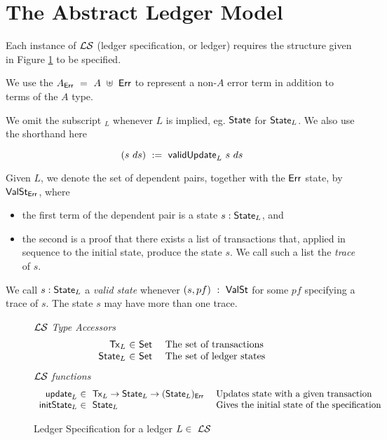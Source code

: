 \section{The Abstract Ledger Model}
\label{sec:model}


Each instance of $\mathcal{L}\mathcal{S}$ (ledger specification, or ledger) requires the structure
given in Figure \ref{fig:ledger-spec} to be specified.

We use the $A_{\mathsf{Err}}~=~A~\uplus~\mathsf{Err}$ to represent a non-$A$ error term in
addition to terms of the $A$ type.

We omit the subscript $_L$ whenever $L$ is implied, eg. $\mathsf{State}$ for $\mathsf{State}_L$.
We also use the shorthand here

\[ (s~ds)~:=~\mathsf{validUpdate}_L~ s~ ds \]


Given $L$, we denote the set of dependent pairs, together with the $\mathsf{Err}$ state, by $\mathsf{ValSt}_{\mathsf{Err}}$, where

\begin{itemize}
  \item the first term of the dependent pair is a state $s : \mathsf{State}_L$, and
  \item the second is a proof that there exists a list of transactions that, applied in sequence to
 the initial state, produce the state $s$. We call such a list the \emph{trace} of $s$.
\end{itemize}

We call $s : \mathsf{State}_L$ a \emph{valid state} whenever $(s, pf)~:~\mathsf{ValSt}$ for some
$pf$ specifying a trace of $s$. The state $s$ may have more than one trace.

\begin{figure*}[htb]
  \emph{$\mathcal{L}\mathcal{S}$ Type Accessors}
  \begin{equation*}
    \begin{array}{r@{~\in~}l@{~~~~}lr}
      \type{Tx}_L
      & \type{Set}
      & \text{The set of transactions} \\
      \type{State}_L
      & \type{Set}
      & \text{The set of ledger states} \\
    \end{array}
  \end{equation*}
  \emph{$\mathcal{L}\mathcal{S}$ functions}
  \begin{equation*}
    \begin{array}{r@{~\in~}l@{~~~~}lr}
    \ups_L & ~\type{Tx}_L \to \type{State}_L \to (\type{State}_L)_{\Err}
    & \text{Updates state with a given transaction} \\
    \fun{initState}_L & ~\type{State}_L
    & \text{Gives the initial state of the specification} \\
    \end{array}
  \end{equation*}
  \caption{Ledger Specification for a ledger $L\in~\mathcal{L}\mathcal{S}$}
  \label{fig:ledger-spec}
\end{figure*}


